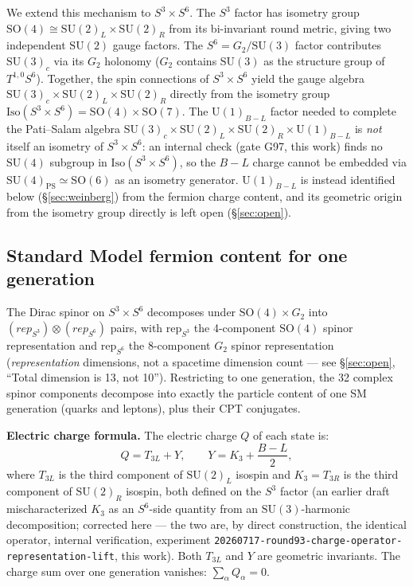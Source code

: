 \documentclass[12pt,a4paper]{article}
\begin{document}
We extend this mechanism to $S^3\times S^6$. The $S^3$ factor has isometry group
$\mathrm{SO}(4)\cong\mathrm{SU}(2)_L\times\mathrm{SU}(2)_R$ from its bi-invariant
round metric, giving two independent $\mathrm{SU}(2)$ gauge factors. The $S^6=G_2/\mathrm{SU}(3)$
factor contributes $\mathrm{SU}(3)_c$ via its $G_2$ holonomy ($G_2$ contains $\mathrm{SU}(3)$
as the structure group of $T^{1,0}S^6$). Together, the spin connections of $S^3\times S^6$
yield the gauge algebra $\mathrm{SU}(3)_c\times\mathrm{SU}(2)_L\times\mathrm{SU}(2)_R$
directly from the isometry group $\mathrm{Iso}(S^3\times S^6)=\mathrm{SO}(4)\times\mathrm{SO}(7)$.
The $\mathrm{U}(1)_{B-L}$ factor needed to complete the Pati--Salam algebra
$\mathrm{SU}(3)_c\times\mathrm{SU}(2)_L\times\mathrm{SU}(2)_R\times\mathrm{U}(1)_{B-L}$ is
\emph{not} itself an isometry of $S^3\times S^6$: an internal check (gate G97, this work)
finds no $\mathrm{SU}(4)$ subgroup in $\mathrm{Iso}(S^3\times S^6)$, so the $B-L$ charge
cannot be embedded via $\mathrm{SU}(4)_{\mathrm{PS}}\simeq\mathrm{SO}(6)$ as an isometry
generator. $\mathrm{U}(1)_{B-L}$ is instead identified below (\S\ref{sec:weinberg}) from
the fermion charge content, and its geometric origin from the isometry group directly is
left open (\S\ref{sec:open}).

\subsection{Standard Model fermion content for one generation}
\label{sec:sm-content}

The Dirac spinor on $S^3\times S^6$ decomposes under $\mathrm{SO}(4)\times G_2$
into $(rep_{S^3})\otimes(rep_{S^6})$ pairs, with $\mathrm{rep}_{S^3}$ the 4-component
$\mathrm{SO}(4)$ spinor representation and $\mathrm{rep}_{S^6}$ the 8-component $G_2$
spinor representation (\emph{representation} dimensions, not a spacetime dimension count
--- see \S\ref{sec:open}, ``Total dimension is 13, not 10''). Restricting to one generation, the 32 complex
spinor components decompose into exactly the particle content of one SM generation (quarks
and leptons), plus their CPT conjugates.

\textbf{Electric charge formula.} The electric charge $Q$ of each state is:
\begin{equation}
  Q = T_{3L} + Y, \qquad Y = K_3 + \frac{B-L}{2},
\end{equation}
where $T_{3L}$ is the third component of $\mathrm{SU}(2)_L$ isospin and
$K_3=T_{3R}$ is the third component of $\mathrm{SU}(2)_R$ isospin, both defined on
the $S^3$ factor (an earlier draft mischaracterized $K_3$ as an $S^6$-side
quantity from an $\mathrm{SU}(3)$-harmonic decomposition; corrected here --- the
two are, by direct construction, the identical operator, internal verification,
experiment \texttt{20260717-round93-charge-operator-representation-lift}, this
work).
Both $T_{3L}$ and $Y$ are geometric invariants. The charge sum over one generation vanishes:
$\sum_\alpha Q_\alpha = 0$.
\end{document}
